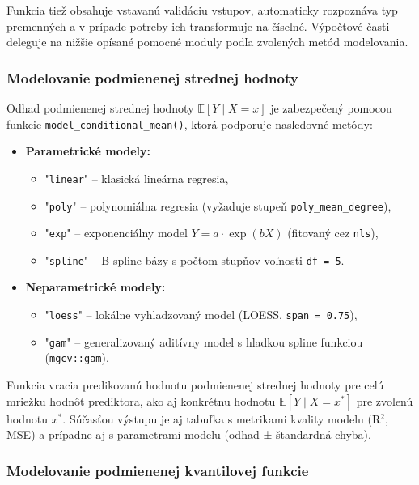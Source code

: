 Funkcia tiež obsahuje vstavanú validáciu vstupov, automaticky rozpoznáva typ premenných a v prípade potreby ich transformuje na číselné. Výpočtové časti deleguje na nižšie opísané pomocné moduly podľa zvolených metód modelovania.

\subsubsection{Modelovanie podmienenej strednej hodnoty}\label{subsec:app_cond_mean}

Odhad podmienenej strednej hodnoty $\mathbb{E}[Y \mid X = x]$ je zabezpečený pomocou funkcie \texttt{model\_conditional\_mean()}, ktorá podporuje nasledovné metódy:

\begin{itemize}
  \item \textbf{Parametrické modely:}
  \begin{itemize}
    \item "\texttt{linear}" – klasická lineárna regresia,
    \item "\texttt{poly}" – polynomiálna regresia (vyžaduje stupeň \texttt{poly\_mean\_degree}),
    \item "\texttt{exp}" – exponenciálny model $Y = a \cdot \exp(bX)$ (fitovaný cez \texttt{nls}),
    \item "\texttt{spline}" – B-spline bázy s počtom stupňov voľnosti \texttt{df = 5}.
  \end{itemize}
  \item \textbf{Neparametrické modely:}
  \begin{itemize}
    \item "\texttt{loess}" – lokálne vyhladzovaný model (LOESS, \texttt{span = 0.75}),
    \item "\texttt{gam}" – generalizovaný aditívny model s hladkou spline funkciou (\texttt{mgcv::gam}).
  \end{itemize}
\end{itemize}

Funkcia vracia predikovanú hodnotu podmienenej strednej hodnoty pre celú mriežku hodnôt prediktora, ako aj konkrétnu hodnotu $\mathbb{E}[Y \mid X = x^*]$ pre zvolenú hodnotu $x^*$. Súčasťou výstupu je aj tabuľka s metrikami kvality modelu (R$^2$, MSE) a prípadne aj s parametrami modelu (odhad ± štandardná chyba).

\subsubsection{Modelovanie podmienenej kvantilovej funkcie}\label{subsec:app_cond_quantile}

